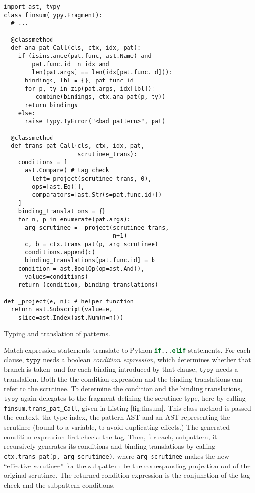\documentclass[preprint,10pt]{sigplanconf}
\newcommand{\typy}{\texttt{typy}}
\newcommand{\lip}[1]{\lstinline[language=Python,basicstyle=\ttfamily\footnotesize,deletendkeywords={tuple,buffer,map}]{#1}}
\newcommand{\li}[1]{\lip{#1}}
\begin{document}
\begin{codelisting}[t]
\vspace{-3px}
\begin{lstlisting}[deletendkeywords={slice}]
import ast, typy
class finsum(typy.Fragment):
  # ... 

  @classmethod
  def ana_pat_Call(cls, ctx, idx, pat):
    if (isinstance(pat.func, ast.Name) and 
        pat.func.id in idx and 
        len(pat.args) == len(idx[pat.func.id])):
      bindings, lbl = {}, pat.func.id
      for p, ty in zip(pat.args, idx[lbl]):
        _combine(bindings, ctx.ana_pat(p, ty))
      return bindings
    else:
      raise typy.TyError("<bad pattern>", pat)

  @classmethod
  def trans_pat_Call(cls, ctx, idx, pat, 
                     scrutinee_trans):
    conditions = [
      ast.Compare( # tag check
        left=_project(scrutinee_trans, 0),
        ops=[ast.Eq()],
        comparators=[ast.Str(s=pat.func.id)])
    ]
    binding_translations = {}
    for n, p in enumerate(pat.args):
      arg_scrutinee = _project(scrutinee_trans, 
                               n+1)
      c, b = ctx.trans_pat(p, arg_scrutinee)
      conditions.append(c)
      binding_translations[pat.func.id] = b
    condition = ast.BoolOp(op=ast.And(), 
      values=conditions)
    return (condition, binding_translations)

def _project(e, n): # helper function
  return ast.Subscript(value=e, 
    slice=ast.Index(ast.Num(n=n)))
\end{lstlisting}
\caption{Typing and translation of patterns.}
\label{fig:finsum}
\end{codelisting}

Match expression statements translate to Python \li{if...elif} statements. For each clause, $\typy$ needs a boolean \emph{condition expression}, which determines whether that branch is taken, and for each binding introduced by that clause, $\typy$ needs a translation. Both the the condition expression and the binding translations can refer to the scrutinee. To determine the condition and the binding translations, $\typy$ again delegates to the fragment defining the scrutinee type, here by calling \li{finsum.trans_pat_Call}, given in Listing \ref{fig:finsum}. This class method is passed the context, the type index, the pattern AST and an AST representing the scrutinee (bound to a variable, to avoid duplicating effects.) The generated condition expression first checks the tag. Then, for each, subpattern, it recursively generates its conditions and binding translations by calling \li{ctx.trans_pat(p, arg_scrutinee)}, where \li{arg_scrutinee} makes the new ``effective scrutinee'' for the subpattern be the corresponding projection out of the original scrutinee. The returned condition expression is the conjunction of the tag check and the subpattern conditions.
\end{document}
